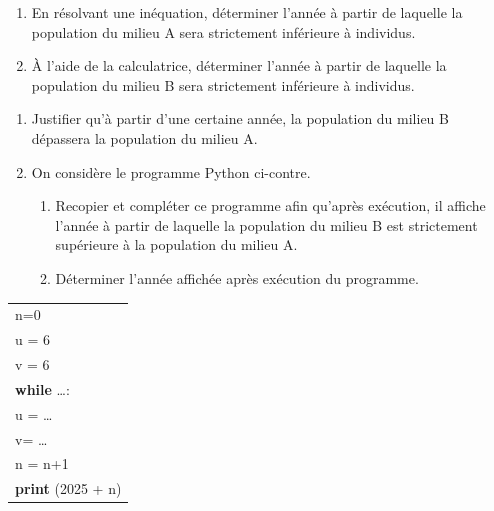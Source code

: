 \begin{enumerate}
\item En résolvant une inéquation, déterminer l'année à partir de laquelle la population du milieu A sera strictement inférieure à  individus.
\item À l'aide de la calculatrice, déterminer l'année à partir de laquelle la population du milieu B sera strictement inférieure à  individus.
\end{enumerate}
\begin{minipage}{0.78\linewidth}
\begin{enumerate}[resume]
\item Justifier qu'à partir d'une certaine année, la population du milieu B dépassera la population du milieu A.
\item On considère le programme Python ci-contre.
	\begin{enumerate}
		\item Recopier et compléter ce programme afin qu'après exécution, il affiche l'année à partir de laquelle la population du milieu B est strictement supérieure à la population du milieu A.
		\item Déterminer l'année affichée après exécution du programme.
	\end{enumerate}
\end{enumerate}
\end{minipage}\hfill
\begin{minipage}{0.19\linewidth}
\begin{tabular}{|l|}\hline
n=0 \\
u = 6\\
v = 6 \\
\textbf{while} \ldots :\\
\qquad u = \ldots\\
\qquad v= \ldots\\
\qquad n = n+1\\
\textbf{print} (2025 + n)\\ \hline
\end{tabular}
\end{minipage}
